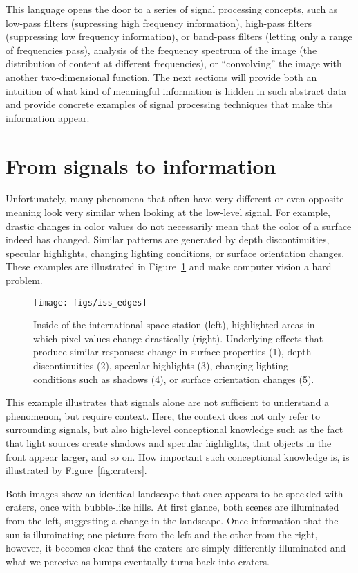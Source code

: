 This language opens the door to a series of signal processing concepts, such as low-pass filters (supressing high frequency information), high-pass filters (suppressing low frequency information), or band-pass filters (letting only a range of frequencies pass), analysis of the frequency spectrum of the image (the distribution of content at different frequencies), or ``convolving'' the image with another two-dimensional function. The next sections will provide both an intuition of what kind of meaningful information is hidden in such abstract data and provide concrete examples of signal processing techniques that make this information appear.

\section{From signals to information}
Unfortunately, many phenomena that often have very different or even opposite meaning look very similar when looking at the low-level signal. For example, drastic changes in color values do not necessarily mean that the color of a surface indeed has changed. Similar patterns are generated by depth discontinuities, specular highlights, changing lighting conditions, or surface orientation changes. These examples are illustrated in Figure~\ref{fig:iss_edges} and make computer vision a hard problem.

\begin{figure}[!htb]
    \centering
    \texttt{[image: figs/iss\_edges]}
    \caption{Inside of the international space station (left), highlighted areas in which pixel values change drastically (right). Underlying effects that produce similar responses: change in surface properties (1), depth discontinuities (2), specular highlights (3), changing lighting conditions such as shadows (4), or surface orientation changes (5).
    \label{fig:iss_edges}}
\end{figure}

This example illustrates that signals alone are not sufficient to understand a phenomenon, but require context. Here, the context does not only refer to surrounding signals, but also high-level conceptional knowledge such as the fact that light sources create shadows and specular highlights, that objects in the front appear larger, and so on. How important such conceptional knowledge is, is illustrated by Figure~\ref{fig:craters}.

Both images show an identical landscape that once appears to be speckled with craters, once with bubble-like hills. At first glance, both scenes are illuminated from the left, suggesting a change in the landscape. Once information that the sun is illuminating one picture from the left and the other from the right, however, it becomes clear that the craters are simply differently illuminated and what we perceive as bumps eventually turns back into craters.

